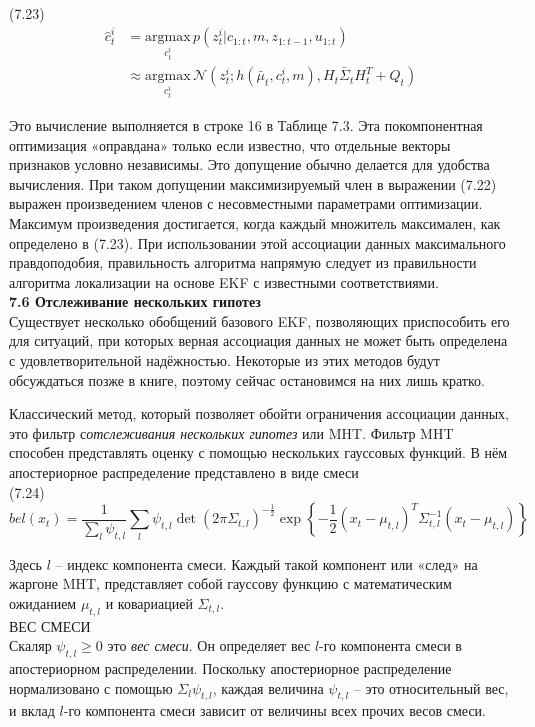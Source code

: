 \documentclass[10pt,a4paper]{article}
\begin{document}
(7.23) 
\begin{equation*}
\begin{split}
\hat{c}_t^i&=\underset{c_t^i}{\text{argmax}}\,p(z_t^i|c_{1:t},m,z_{1:t-1},u_{1:t})\\
&\approx\underset{c_t^i}{\text{argmax}}\,\mathcal{N}(z_t^i;h(\bar{\mu}_t,c_t^i,m),H_t\bar{\varSigma}_tH_t^T+Q_t)
\end{split}
\end{equation*}

Это вычисление выполняется в строке 16 в Таблице 7.3. Эта покомпонентная оптимизация «оправдана» только если известно, что отдельные векторы признаков условно независимы. Это допущение обычно делается для удобства вычисления. При таком допущении максимизируемый член в выражении (7.22) выражен произведением  членов с несовместными параметрами оптимизации. Максимум произведения достигается, когда каждый множитель максимален, как определено в (7.23). При использовании этой ассоциации данных максимального правдоподобия, правильность алгоритма напрямую следует из правильности алгоритма локализации на основе EKF с известными соответствиями.\\

\textbf{7.6 Отслеживание нескольких гипотез}\\

Существует несколько обобщений базового EKF, позволяющих приспособить его для ситуаций, при которых верная ассоциация данных не может быть определена с удовлетворительной надёжностью. Некоторые из этих методов будут обсуждаться позже в книге, поэтому сейчас остановимся на них лишь кратко.

Классический метод, который позволяет обойти ограничения ассоциации данных, это фильтр с\textit{отслеживания нескольких гипотез} или MHT. Фильтр MHT способен представлять оценку с помощью нескольких гауссовых функций. В нём апостериорное распределение представлено в виде смеси\\

(7.24)
$$bel(x_t)=\frac{1}{\sum_l\psi_{t,l}}\sum_l\psi_{t,l}\det(2\pi\varSigma_{t,l})^{-\frac{1}{2}}\exp\left\lbrace -\frac{1}{2}(x_t-\mu_{t,l})^T\varSigma_{t,l}^{-1}(x_t-\mu_{t,l})\right\rbrace $$

Здесь $l$ – индекс компонента смеси. Каждый такой компонент или «след» на жаргоне MHT, представляет собой гауссову функцию с математическим ожиданием $\mu_{t,l}$ и ковариацией $\varSigma_{t,l}$.\\
ВЕС СМЕСИ\\ Скаляр $\psi_{t,l}\geq0$ это \textit{вес смеси}. Он определяет вес $l$-го компонента смеси в апостериорном распределении. Поскольку апостериорное распределение нормализовано с помощью $\varSigma_l\psi_{t,l}$, каждая величина $\psi_{t,l}$ – это относительный вес, и вклад $l$-го компонента смеси зависит от величины всех прочих весов смеси.
\end{document}

